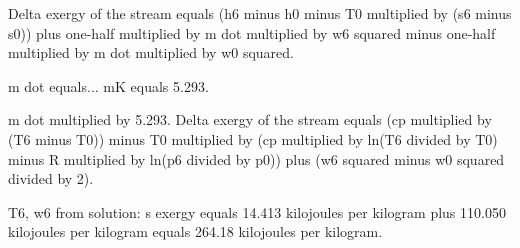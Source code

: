 Delta exergy of the stream equals (h6 minus h0 minus T0 multiplied by (s6 minus s0)) plus one-half multiplied by m dot multiplied by w6 squared minus one-half multiplied by m dot multiplied by w0 squared.  

m dot equals...  
mK equals 5.293.  

m dot multiplied by 5.293. Delta exergy of the stream equals (cp multiplied by (T6 minus T0)) minus T0 multiplied by (cp multiplied by ln(T6 divided by T0) minus R multiplied by ln(p6 divided by p0)) plus (w6 squared minus w0 squared divided by 2).  

T6, w6 from solution:  
s exergy equals 14.413 kilojoules per kilogram plus 110.050 kilojoules per kilogram equals 264.18 kilojoules per kilogram.